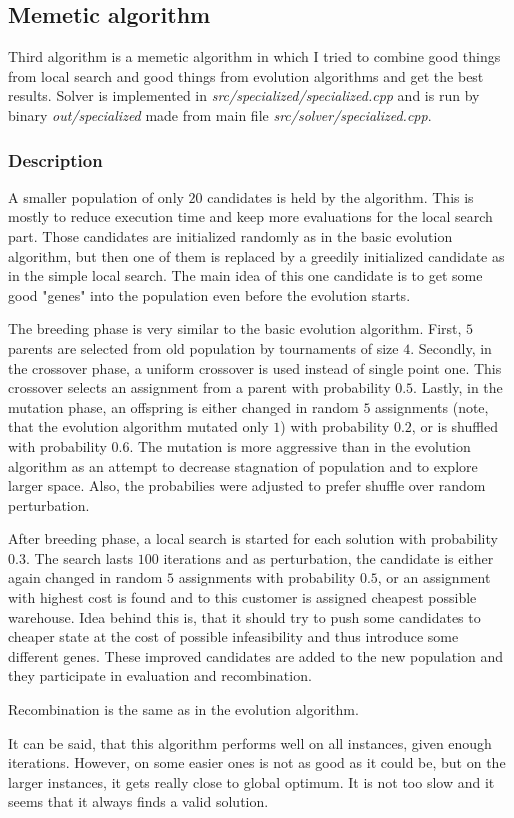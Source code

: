 \documentclass[./main.tex]{subfiles}
\begin{document}
\subsection{Memetic algorithm}
Third algorithm is a memetic algorithm in which I tried to combine good things from local search and good things from evolution algorithms and get the best results.
Solver is implemented in \textit{src/specialized/specialized.cpp} and is run by binary \textit{out/specialized} made from main file \textit{src/solver/specialized.cpp}.

\subsubsection{Description}

A smaller population of only $20$ candidates is held by the algorithm.
This is mostly to reduce execution time and keep more evaluations for the local search part.
Those candidates are initialized randomly as in the basic evolution algorithm, but then one of them is replaced by a greedily initialized candidate as in the simple local search.
The main idea of this one candidate is to get some good "genes" into the population even before the evolution starts.

The breeding phase is very similar to the basic evolution algorithm.
First, $5$ parents are selected from old population by tournaments of size $4$.
Secondly, in the crossover phase, a uniform crossover is used instead of single point one.
This crossover selects an assignment from a parent with probability $0.5$.
Lastly, in the mutation phase, an offspring is either changed in random $5$ assignments (note, that the evolution algorithm mutated only $1$) with probability $0.2$, or is shuffled with probability $0.6$.
The mutation is more aggressive than in the evolution algorithm as an attempt to decrease stagnation of population and to explore larger space.
Also, the probabilies were adjusted to prefer shuffle over random perturbation.

After breeding phase, a local search is started for each solution with probability $0.3$.
The search lasts $100$ iterations and as perturbation, the candidate is either again changed in random $5$ assignments with probability $0.5$, or an assignment with highest cost is found and to this customer is assigned cheapest possible warehouse.
Idea behind this is, that it should try to push some candidates to cheaper state at the cost of possible infeasibility and thus introduce some different genes.
These improved candidates are added to the new population and they participate in evaluation and recombination.

Recombination is the same as in the evolution algorithm.

It can be said, that this algorithm performs well on all instances, given enough iterations.
However, on some easier ones is not as good as it could be, but on the larger instances, it gets really close to global optimum.
It is not too slow and it seems that it always finds a valid solution.
\end{document}
